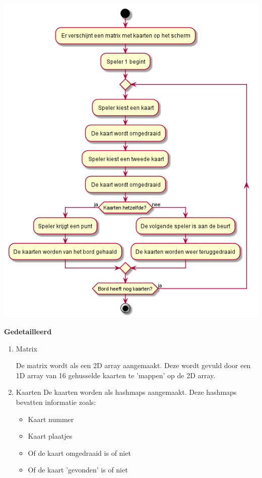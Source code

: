 \documentclass[a4paper,titlepage,11pt]{article}
\begin{document}
\begin{center}
\includegraphics[width=.9\linewidth]{../Images/diagram.png}
\end{center}

{\bf Gedetailleerd}

\begin{enumerate}
\item Matrix

  De matrix wordt als een 2D array aangemaakt. Deze wordt gevuld door een
  1D array van 16 gehusselde kaarten te 'mappen' op de 2D array.

\item Kaarten
De kaarten worden als hashmaps aangemaakt. Deze hashmaps bevatten informatie zoals:

\begin{itemize}
\item Kaart nummer
\item Kaart plaatjes
\item Of de kaart omgedraaid is of niet
\item Of de kaart 'gevonden' is of niet
\end{itemize}
\end{enumerate}
\end{document}
